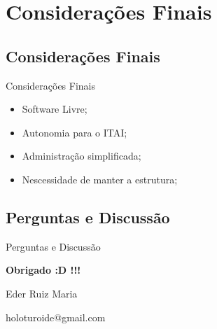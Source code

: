 \renewcommand{\titulo}{Considerações Finais}
\section{\titulo}


\renewcommand{\titulo}{Considerações Finais}
\subsection{\titulo}
\begin{frame}{\titulo}
\begin{itemize}
\item Software Livre;
\item Autonomia para o ITAI;
\item Administração simplificada;
\item Nescessidade de manter a estrutura;
\end{itemize}
\end{frame}

\renewcommand{\titulo}{Perguntas e Discussão}
\subsection{\titulo}
\begin{frame}{\titulo}
\begin{center}
\textbf{Obrigado :D !!!}

\vspace{1cm}
Eder Ruiz Maria

holoturoide@gmail.com
\end{center}
\end{frame}



